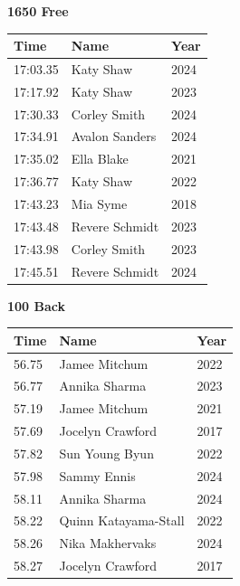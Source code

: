 \vspace{1.2em}
\noindent\begin{minipage}[t]{0.48\textwidth}
\centering
\textbf{\textcolor{teamprimary}{1650 Free}}\par
\vspace{0.5em}
\centering
\small
\renewcommand{\arraystretch}{1.0}
\setlength{\tabcolsep}{4pt}
\begin{tabular}{@{}p{1.8cm}p{3.0cm}p{1.0cm}@{}}
\toprule
\textbf{Time} & \textbf{Name} & \textbf{Year} \\
\midrule
17:03.35 & Katy Shaw & 2024 \\
17:17.92 & Katy Shaw & 2023 \\
17:30.33 & Corley Smith & 2024 \\
17:34.91 & Avalon Sanders & 2024 \\
17:35.02 & Ella Blake & 2021 \\
17:36.77 & Katy Shaw & 2022 \\
17:43.23 & Mia Syme & 2018 \\
17:43.48 & Revere Schmidt & 2023 \\
17:43.98 & Corley Smith & 2023 \\
17:45.51 & Revere Schmidt & 2024 \\
\bottomrule
\end{tabular}
\end{minipage}
\hfill
\begin{minipage}[t]{0.48\textwidth}
\centering
\textbf{\textcolor{teamprimary}{100 Back}}\par
\vspace{0.5em}
\centering
\small
\renewcommand{\arraystretch}{1.0}
\setlength{\tabcolsep}{4pt}
\begin{tabular}{@{}p{1.8cm}p{3.0cm}p{1.0cm}@{}}
\toprule
\textbf{Time} & \textbf{Name} & \textbf{Year} \\
\midrule
56.75 & Jamee Mitchum & 2022 \\
56.77 & Annika Sharma & 2023 \\
57.19 & Jamee Mitchum & 2021 \\
57.69 & Jocelyn Crawford & 2017 \\
57.82 & Sun Young Byun & 2022 \\
57.98 & Sammy Ennis & 2024 \\
58.11 & Annika Sharma & 2024 \\
58.22 & Quinn Katayama-Stall & 2022 \\
58.26 & Nika Makhervaks & 2024 \\
58.27 & Jocelyn Crawford & 2017 \\
\bottomrule
\end{tabular}
\end{minipage}
